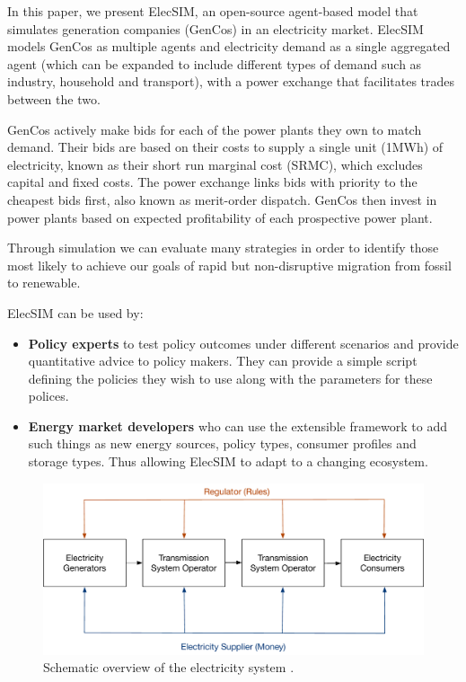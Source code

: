 In this paper, we present ElecSIM, an open-source agent-based model that simulates generation companies (GenCos) in an electricity market. ElecSIM models GenCos as multiple agents and electricity demand as a single aggregated agent (which can be expanded to include different types of demand such as industry, household and transport), with a power exchange that facilitates trades between the two. 

GenCos actively make bids for each of the power plants they own to match demand. Their bids are based on their costs to supply a single unit (1MWh) of electricity, known as their short run marginal cost (SRMC), which excludes capital and fixed costs. The power exchange links bids with priority to the cheapest bids first, also known as merit-order dispatch. GenCos then invest in power plants based on expected profitability of each prospective power plant.


Through simulation we can evaluate many strategies in order to identify those most likely to achieve our goals of rapid but non-disruptive migration from fossil to renewable. 

ElecSIM can be used by:
\begin{itemize}
	\item {\bf Policy experts} to test policy outcomes under different scenarios and provide quantitative advice to policy makers. They can provide a simple script defining the policies they wish to use along with the parameters for these polices.
	\item {\bf Energy market developers} who can use the extensible framework to add such things as new energy sources, policy types, consumer profiles and storage types. Thus allowing ElecSIM to adapt to a changing ecosystem.
\end{itemize}


\begin{figure}
	\centering
	\includegraphics[width=0.9\linewidth]{figures/main_electricty_players}
	\caption{Schematic overview of the electricity system \cite{Erbach2016}.}
	\label{fig:mainelectrictyplayers}
\end{figure}



